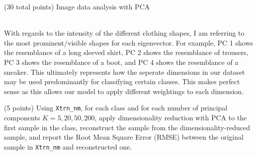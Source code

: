 \documentclass[12pt]{article}
\begin{document}
\begin{question}{(30 total points) Image data analysis with PCA}
\begin{subquestion}
\begin{answerbox}{40.5em}
{\\
        With regards to the intensity of the different clothing shapes, I am referring to the most prominent/visible shapes for each eigenvector. For example, PC 1 shows the resemblance of a long sleeved shirt, PC 2 shows the resemblance of trousers, PC 3 shows the resemblance of a boot, and PC 4 shows the resemblance of a sneaker. This ultimately represents how the seperate dimensions in our dataset may be used predominantly for classifying certain classes. This makes perfect sense as this allows our model to apply different weightings to each dimension.
}
      \end{answerbox}
  


   \end{subquestion}

   \begin{subquestion}{(5 points)
       Using \texttt{Xtrn\_nm}, 
       for each class and for each number of principal components $K =
       5, 20, 50, 200$, apply dimensionality reduction with PCA to the
       first sample in the class, reconstruct the sample from the
       dimensionality-reduced sample, and 
       report the Root Mean Square Error (RMSE) between the
       original sample in {\tt Xtrn\_nm} and reconstructed one.
     } \label{Q1.6}

     


\end{subquestion}
\end{question}
\end{document}

